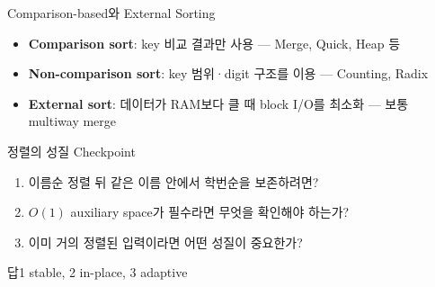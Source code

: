 \begin{frame}{Comparison-based와 External Sorting}
\optional[선택 심화]\hfill
\begin{itemize}\item \textbf{Comparison sort}: key 비교 결과만 사용 — Merge, Quick, Heap 등\item \textbf{Non-comparison sort}: key 범위·digit 구조를 이용 — Counting, Radix\item \textbf{External sort}: 데이터가 RAM보다 클 때 block I/O를 최소화 — 보통 multiway merge\end{itemize}
\end{frame}
\begin{frame}{정렬의 성질 Checkpoint}
\begin{enumerate}\item 이름순 정렬 뒤 같은 이름 안에서 학번순을 보존하려면?\item $O(1)$ auxiliary space가 필수라면 무엇을 확인해야 하는가?\item 이미 거의 정렬된 입력이라면 어떤 성질이 중요한가?\end{enumerate}
\begin{exampleblock}{답}1 stable, 2 in-place, 3 adaptive\end{exampleblock}
\vfill{}
\end{frame}
